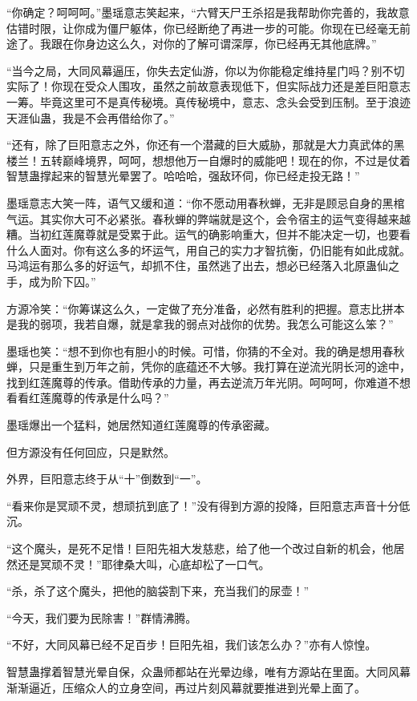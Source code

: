 \begin{this_body}
“你确定？呵呵呵。”墨瑶意志笑起来，“六臂天尸王杀招是我帮助你完善的，我故意估错时限，让你成为僵尸躯体，你已经断绝了再进一步的可能。你现在已经毫无前途了。我跟在你身边这么久，对你的了解可谓深厚，你已经再无其他底牌。”

“当今之局，大同风幕逼压，你失去定仙游，你以为你能稳定维持星门吗？别不切实际了！你现在受众人围攻，虽然之前故意表现低下，但实际战力还是差巨阳意志一筹。毕竟这里可不是真传秘境。真传秘境中，意志、念头会受到压制。至于浪迹天涯仙蛊，我是不会再借给你了。”

“还有，除了巨阳意志之外，你还有一个潜藏的巨大威胁，那就是大力真武体的黑楼兰！五转巅峰境界，呵呵，想想他万一自爆时的威能吧！现在的你，不过是仗着智慧蛊撑起来的智慧光晕罢了。哈哈哈，强敌环伺，你已经走投无路！”

墨瑶意志大笑一阵，语气又缓和道：“你不愿动用春秋蝉，无非是顾忌自身的黑棺气运。其实你大可不必紧张。春秋蝉的弊端就是这个，会令宿主的运气变得越来越糟。当初红莲魔尊就是受累于此。运气的确影响重大，但并不能决定一切，也要看什么人面对。你有这么多的坏运气，用自己的实力才智抗衡，仍旧能有如此成就。马鸿运有那么多的好运气，却抓不住，虽然逃了出去，想必已经落入北原蛊仙之手，成为阶下囚。”

方源冷笑：“你筹谋这么久，一定做了充分准备，必然有胜利的把握。意志比拼本是我的弱项，我若自爆，就是拿我的弱点对战你的优势。我怎么可能这么笨？”

墨瑶也笑：“想不到你也有胆小的时候。可惜，你猜的不全对。我的确是想用春秋蝉，只是重生到万年之前，凭你的底蕴还不大够。我打算在逆流光阴长河的途中，找到红莲魔尊的传承。借助传承的力量，再去逆流万年光阴。呵呵呵，你难道不想看看红莲魔尊的传承是什么吗？”

墨瑶爆出一个猛料，她居然知道红莲魔尊的传承密藏。

但方源没有任何回应，只是默然。

外界，巨阳意志终于从“十”倒数到“一”。

“看来你是冥顽不灵，想顽抗到底了！”没有得到方源的投降，巨阳意志声音十分低沉。

“这个魔头，是死不足惜！巨阳先祖大发慈悲，给了他一个改过自新的机会，他居然还是冥顽不灵！”耶律桑大叫，心底却松了一口气。

“杀，杀了这个魔头，把他的脑袋割下来，充当我们的尿壶！”

“今天，我们要为民除害！”群情沸腾。

“不好，大同风幕已经不足百步！巨阳先祖，我们该怎么办？”亦有人惊惶。

智慧蛊撑着智慧光晕自保，众蛊师都站在光晕边缘，唯有方源站在里面。大同风幕渐渐逼近，压缩众人的立身空间，再过片刻风幕就要推进到光晕上面了。

\end{this_body}

